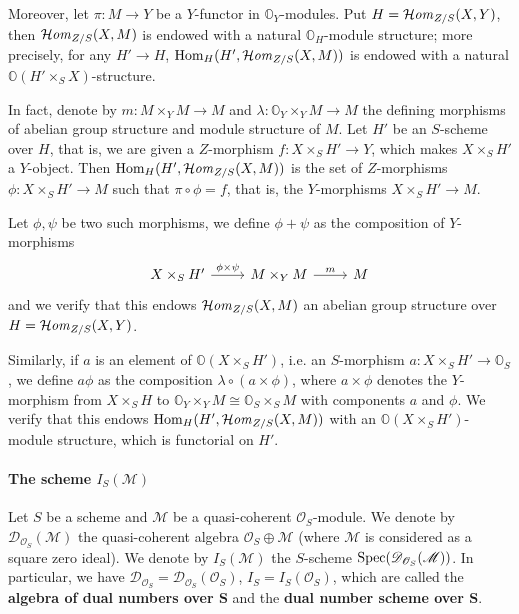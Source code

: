 \begin{remark}\label{category of presheaf functor Hom module structure}
Moreover, let $\pi:M\to Y$ be a $Y$-functor in $\mathbb{O}_Y$-modules. Put $H=\operatorname{\mathcal{H}\hspace*{-0.4pt}\textit{om}\hspace{0.5pt}}_{Z/S}(X,Y)$, then $\operatorname{\mathcal{H}\hspace*{-0.4pt}\textit{om}\hspace{0.5pt}}_{Z/S}(X,M)$ is endowed with a natural $\mathbb{O}_H$-module structure; more precisely, for any $H'\to H$, $\mathrm{Hom}_H(H',\operatorname{\mathcal{H}\hspace*{-0.4pt}\textit{om}\hspace{0.5pt}}_{Z/S}(X,M))$ is endowed with a natural $\mathbb{O}(H'\times_SX)$-structure.\par
In fact, denote by $m:M\times_YM\to M$ and $\lambda:\mathbb{O}_Y\times_YM\to M$ the defining morphisms of abelian group structure and module structure of $M$. Let $H'$ be an $S$-scheme over $H$, that is, we are given a $Z$-morphism $f:X\times_SH'\to Y$, which makes $X\times_SH'$ a $Y$-object. Then $\mathrm{Hom}_H(H',\operatorname{\mathcal{H}\hspace*{-0.4pt}\textit{om}\hspace{0.5pt}}_{Z/S}(X,M))$ is the set of $Z$-morphisms $\phi:X\times_SH'\to M$ such that $\pi\circ\phi=f$, that is, the $Y$-morphisms $X\times_SH'\to M$.\par
Let $\phi,\psi$ be two such morphisms, we define $\phi+\psi$ as the composition of $Y$-morphisms
\[\begin{tikzcd}
X\times_SH'\ar[r,"\phi\times\psi"]&M\times_YM\ar[r,"m"]&M
\end{tikzcd}\]
and we verify that this endows $\operatorname{\mathcal{H}\hspace*{-0.4pt}\textit{om}\hspace{0.5pt}}_{Z/S}(X,M)$ an abelian group structure over $H=\operatorname{\mathcal{H}\hspace*{-0.4pt}\textit{om}\hspace{0.5pt}}_{Z/S}(X,Y)$.\par
Similarly, if $a$ is an element of $\mathbb{O}(X\times_SH')$, i.e. an $S$-morphism $a:X\times_SH'\to\mathbb{O}_S$, we define $a\phi$ as the composition $\lambda\circ(a\times\phi)$, where $a\times\phi$ denotes the $Y$-morphism from $X\times_SH$ to $\mathbb{O}_Y\times_YM\cong\mathbb{O}_S\times_SM$ with components $a$ and $\phi$. We verify that this endows $\mathrm{Hom}_H(H',\operatorname{\mathcal{H}\hspace*{-0.4pt}\textit{om}\hspace{0.5pt}}_{Z/S}(X,M))$ with an $\mathbb{O}(X\times_SH')$-module structure, which is functorial on $H'$.
\end{remark}

\paragraph{The scheme \texorpdfstring{$I_S(\mathscr{M})$}{I}}\label{scheme tangent bundle I_S paragraph}
\begin{definition}
Let $S$ be a scheme and $\mathscr{M}$ be a quasi-coherent $\mathscr{O}_S$-module. We denote by $\mathscr{D}_{\mathscr{O}_S}(\mathscr{M})$ the quasi-coherent algebra $\mathscr{O}_S\oplus\mathscr{M}$ (where $\mathscr{M}$ is considered as a square zero ideal). We denote by $I_S(\mathscr{M})$ the $S$-scheme $\mathrm{Spec}(\mathscr{D}_{\mathscr{O}_S}(\mathscr{M}))$. In particular, we have $\mathscr{D}_{\mathscr{O}_S}=\mathscr{D}_{\mathscr{O}_S}(\mathscr{O}_S)$, $I_S=I_S(\mathscr{O}_S)$, which are called the \textbf{algebra of dual numbers over $\bm{S}$} and the \textbf{dual number scheme over $\bm{S}$}.
\end{definition}

